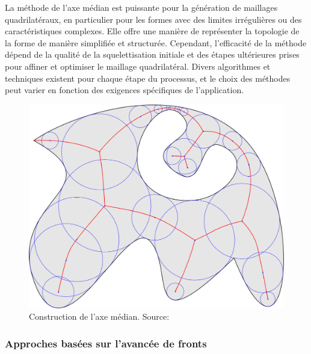 La méthode de l'axe médian est puissante pour la génération de maillages quadrilatéraux, en particulier pour les formes avec des limites irrégulières ou des caractéristiques complexes. Elle offre une manière de représenter la topologie de la forme de manière simplifiée et structurée. Cependant, l'efficacité de la méthode dépend de la qualité de la squelettisation initiale et des étapes ultérieures prises pour affiner et optimiser le maillage quadrilatéral. Divers algorithmes et techniques existent pour chaque étape du processus, et le choix des méthodes peut varier en fonction des exigences spécifiques de l'application.

\begin{figure}
    \centering
    \includegraphics[scale=0.3]{images/median_axis.png}
    \caption{Construction de l'axe médian. Source: \cite{de2009fast}}
    \label{fig:median_axis}
\end{figure}

\subsubsection{Approches basées sur l'avancée de fronts}

